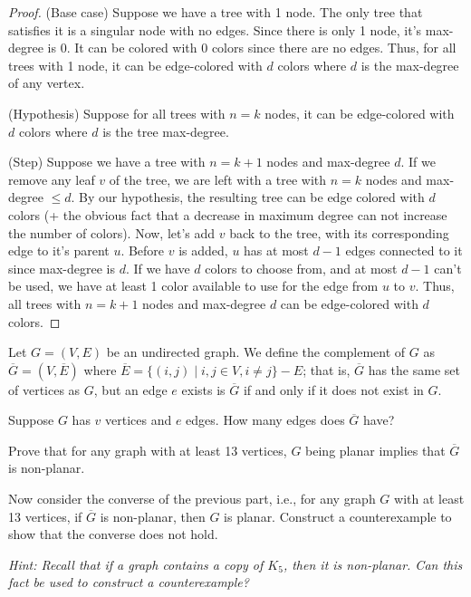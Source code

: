 \documentclass[11pt]{article}
\begin{document}
\begin{solution}
\begin{Parts}
\Part \begin{proof}
(Base case) Suppose we have a tree with 1 node. 
The only tree that satisfies it is a singular node with no edges.
Since there is only 1 node, it's max-degree is 0.
It can be colored with 0 colors since there are no edges.
Thus, for all trees with 1 node, it can be edge-colored with $d$ colors where $d$ is the max-degree of any vertex.

(Hypothesis) Suppose for all trees with $n=k$ nodes, it can be edge-colored with $d$ colors where $d$ is the tree max-degree.

(Step) Suppose we have a tree with $n=k+1$ nodes and max-degree $d$.
If we remove any leaf $v$ of the tree, we are left with a tree with $n=k$ nodes and max-degree $\leq d$.
By our hypothesis, the resulting tree can be edge colored with $d$ colors (+ the obvious fact that a decrease in maximum degree can not increase the number of colors).
Now, let's add $v$ back to the tree, with its corresponding edge to it's parent $u$.
Before $v$ is added, $u$ has at most $d-1$ edges connected to it since max-degree is $d$.
If we have $d$ colors to choose from, and at most $d-1$ can't be used, we have at least 1 color available to use for the edge from $u$ to $v$.
Thus, all trees with $n=k+1$ nodes and max-degree $d$ can be edge-colored with $d$ colors.
\end{proof}\end{Parts}\end{solution}\newpage


Let $G = (V, E)$ be an undirected graph.  We define the complement of $G$ as $\overline{G} = (V, \overline{E})$ where $\overline{E} = \{(i,j) \mid i,j \in V, i \neq j\} - E$; that is, $\overline{G}$ has the same set of vertices as $G$, but an edge $e$ exists is $\overline{G}$ if and only if it does not exist in $G$.

\begin{Parts}

\Part Suppose $G$ has $v$ vertices and $e$ edges.  How many edges does $\overline{G}$ have?

\Part Prove that for any graph with at least 13 vertices, $G$ being planar implies that $\overline{G}$ is non-planar.

\Part Now consider the converse of the previous part, i.e., for any graph $G$ with at least 13 vertices, if $\overline{G}$ is non-planar, then $G$ is planar. Construct a counterexample to show that the converse does not hold.

\textit{Hint: Recall that if a graph contains a copy of $K_5$, then it is non-planar. Can this fact be used to construct a counterexample?}

\end{Parts}
\end{document}
